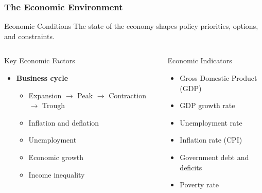 \documentclass[10pt]{beamer}
\begin{document}
\begin{frame}
\frametitle{The Economic Environment}

\begin{block}{Economic Conditions}
The state of the economy shapes policy priorities, options, and constraints.
\end{block}

\vspace{0.5cm}

\begin{columns}
\begin{column}{0.48\textwidth}
\begin{block}{Key Economic Factors}
\pause
\begin{itemize}
\item \textbf{Business cycle}
\begin{itemize}
\item Expansion $\rightarrow$ Peak $\rightarrow$ Contraction $\rightarrow$ Trough
\item Inflation and deflation
\item Unemployment
\item Economic growth
\item Income inequality
\end{itemize}
\end{itemize}
\end{block}
\end{column}

\begin{column}{0.48\textwidth}
\begin{block}{Economic Indicators}
\pause
\begin{itemize}
\item Gross Domestic Product (GDP)
\item GDP growth rate
\item Unemployment rate
\item Inflation rate (CPI)
\item Government debt and deficits
\item Poverty rate
\end{itemize}
\end{block}
\end{column}
\end{columns}

\end{frame}
\end{document}
